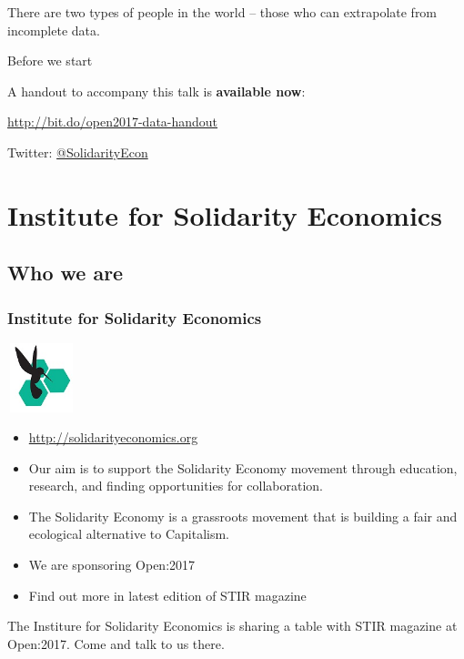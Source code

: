 \geek There are two types of people in the world -- those who can extrapolate from incomplete data.

\startslide
\begin{frame}{Before we start}
  \begin{center}
    A handout to accompany this talk is \textbf{available now}:

    \url{http://bit.do/open2017-data-handout}


	  \vspace{1cm}
    Twitter: \href{https://twitter.com/SolidarityEcon}{@SolidarityEcon}
  \end{center}
\end{frame}
\slideend
\frame{\titlepage}

\frame{\tableofcontents}

\section{Institute for Solidarity Economics}
\subsection{Who we are}
\startslide
\frame
{
  \frametitle{Institute for Solidarity Economics}
  \begin{center}
    \includegraphics[height=2cm,width=2cm]{ise-logo.jpg}
  \end{center}
  \begin{itemize}
    \item<1-> \url{http://solidarityeconomics.org}
    \item<1-> Our aim is to support the Solidarity Economy movement through education, research, and finding opportunities for collaboration.
    \item<2-> The Solidarity Economy is a grassroots movement that is building a fair and ecological alternative to Capitalism.
    \item<3-> We are sponsoring Open:2017
    \item<3-> Find out more in latest edition of STIR magazine
  \end{itemize}
}
\slideend
The Institure for Solidarity Economics is sharing a table with STIR magazine at Open:2017. 
Come and talk to us there.

